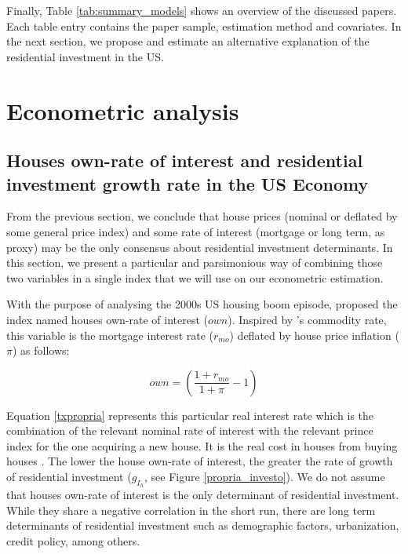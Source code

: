 \documentclass[12pt, a4paper]{article}
\begin{document}
Finally, Table \ref{tab:summary_models} shows an overview of the discussed papers.
Each table entry contains the paper sample, estimation method and covariates.
In the next section, we propose and estimate an alternative explanation of the residential investment in the US.




\section{Econometric analysis}
\label{sec:org8b06469}
\label{sec:VECM}
\subsection{Houses own-rate of interest and residential investment growth rate in the US Economy}
\label{sec:orge584bd0}
\label{sec:own}

From the previous section, we conclude that house prices (nominal or deflated by some general price index) and some rate of interest (mortgage or long term, as proxy) may be the only consensus about residential investment determinants.
In this section, we present a particular and parsimonious way of combining those two variables  in a single index that we will use on our econometric estimation.


With the purpose of analysing the 2000s US housing boom episode, \textcite{teixeira_crescimento_2015}  proposed the index named houses own-rate of interest (\(own\)).
Inspired by \citeauthor*{sraffaDrHayekMoney1932}'s \citeyear{sraffaDrHayekMoney1932} commodity rate, this variable is the mortgage interest rate (\(r_{mo}\)) deflated by house price inflation (\(\pi\)) as follows:
\begin{latex}
\begin{equation}
\label{txpropria}
own =  \left(\frac{1+r_{mo}}{1+\pi} - 1\right)
\end{equation}
\end{latex}
Equation \ref{txpropria} represents this particular real interest rate which is the combination of the relevant nominal rate of interest with the relevant prince index for the one acquiring a new house.
It is the real cost in houses from buying houses  \cite[p.~53]{teixeira_crescimento_2015}.
The lower the house own-rate of interest, the greater the rate of growth of residential investment (\(g_{I_{h}}\), see Figure \ref{propria_investo}).
We do not assume that houses own-rate of interest is the only determinant of residential investment.
While they share a negative correlation in the short run, there are long term determinants of residential investment such as demographic factors, urbanization, credit policy, among others.
\end{document}

